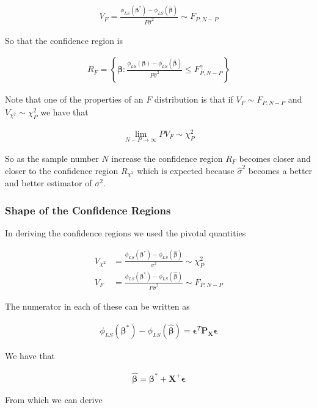 \documentclass[12pt]{article}
\newcommand{\ep}{\epsilon}
\newcommand{\bv}[1]{\boldsymbol{#1}}
\begin{document}
\begin{align}
V_F = \frac{\phi_{LS}(\bv{\beta^*}) - \phi_{LS}(\bv{\hat{\beta}})}{P \hat{\sigma}^2} \sim F_{P,N-P}
\end{align}

So that the confidence region is

\begin{align}
R_F = \left\{\bv{\beta}: \frac{\phi_{LS}(\bv{\beta}) - \phi_{LS}(\bv{\hat{\beta}})}{P\hat{\sigma}^2} \le F_{P,N-P}^{\gamma}\right\}
\end{align}

Note that one of the properties of an $F$ distribution is that if $V_F \sim F_{P,N-P}$ and $V_{\chi^2} \sim \chi^2_P$ we have that

\begin{align}
\lim_{N-P \rightarrow \infty} PV_F \sim \chi^2_P
\end{align}

So as the sample number $N$ increase the confidence region $R_F$ becomes closer and closer to the confidence region $R_{\chi^2}$ which is expected because $\hat{\sigma}^2$ becomes a better and better estimator of $\sigma^2$.

\subsubsection{Shape of the Confidence Regions}

In deriving the confidence regions we used the pivotal quantities

\begin{align}
V_{\chi^2} &= \frac{\phi_{LS}(\bv{\beta^*}) - \phi_{LS}(\bv{\hat{\beta}})}{\sigma^2} \sim \chi^2_P\\
V_F &= \frac{\phi_{LS}(\bv{\beta^*}) - \phi_{LS}(\bv{\hat{\beta}})}{P \hat{\sigma}^2} \sim F_{P,N-P}
\end{align}

The numerator in each of these can be written as

\begin{align}
\phi_{LS}(\bv{\beta^*}) - \phi_{LS}(\bv{\hat{\beta}}) = \bv{\ep}^T\bv{P_X}\bv{\ep}
\end{align}

We have that

\begin{align}
\bv{\hat{\beta}} = \bv{\beta^*} + \bv{X}^+\bv{\ep}
\end{align}

From which we can derive
\end{document}
